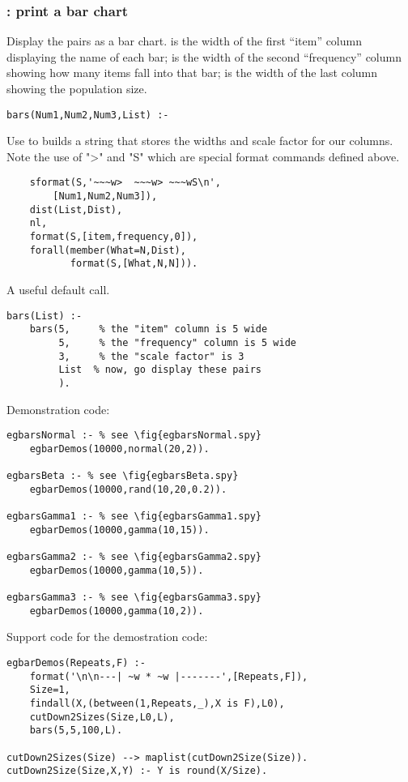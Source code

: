 \subsubsection{ : print a bar chart
}
\label{sec:bars}
Display the pairs as a bar chart.
 is the width of the first ``item'' column
displaying the name of each bar;
 is the width of the second 
``frequency'' column showing how many items
fall into that bar;
 is the width of the last column showing
the population size.
\begin{Verbatim}
bars(Num1,Num2,Num3,List) :-
\end{Verbatim}
Use  to builds a string  that
stores the widths and scale factor
for our columns. Note the use of ">" and "S"
which are special format commands defined above.
 \begin{Verbatim}  
    sformat(S,'~~~w>  ~~~w> ~~~wS\n',
        [Num1,Num2,Num3]),
    dist(List,Dist),
    nl,
    format(S,[item,frequency,0]),
    forall(member(What=N,Dist),
           format(S,[What,N,N])).
\end{Verbatim}   
A useful default call.
\begin{Verbatim}
bars(List) :- 
    bars(5,     % the "item" column is 5 wide
         5,     % the "frequency" column is 5 wide
         3,     % the "scale factor" is 3
         List  % now, go display these pairs
         ).
\end{Verbatim}
Demonstration code:
\begin{Verbatim}
egbarsNormal :- % see \fig{egbarsNormal.spy}
    egbarDemos(10000,normal(20,2)).
    
egbarsBeta :- % see \fig{egbarsBeta.spy}
    egbarDemos(10000,rand(10,20,0.2)).
    
egbarsGamma1 :- % see \fig{egbarsGamma1.spy}
    egbarDemos(10000,gamma(10,15)).
    
egbarsGamma2 :- % see \fig{egbarsGamma2.spy}
    egbarDemos(10000,gamma(10,5)).
    
egbarsGamma3 :- % see \fig{egbarsGamma3.spy}
    egbarDemos(10000,gamma(10,2)).
\end{Verbatim}
Support code for the demostration code:
\begin{Verbatim}
egbarDemos(Repeats,F) :-
    format('\n\n---| ~w * ~w |-------',[Repeats,F]),
    Size=1,
    findall(X,(between(1,Repeats,_),X is F),L0),
    cutDown2Sizes(Size,L0,L),
    bars(5,5,100,L).

cutDown2Sizes(Size) --> maplist(cutDown2Size(Size)).
cutDown2Size(Size,X,Y) :- Y is round(X/Size).
\end{Verbatim}

